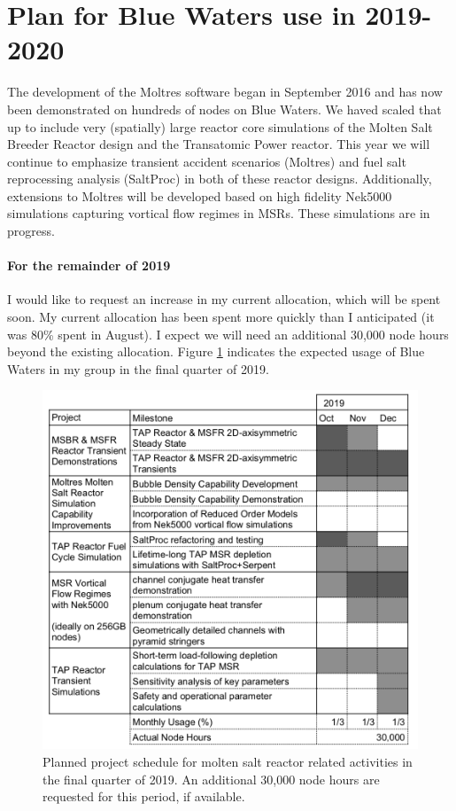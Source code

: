\documentclass[letterpaper]{article}
\begin{document}
\section{Plan for Blue Waters use in 2019-2020}

The development of the Moltres software  began in September 2016 and has now been
demonstrated on hundreds of nodes on Blue Waters. We haved scaled that up to
include very (spatially) large reactor core simulations of the Molten Salt 
Breeder Reactor design and the Transatomic Power reactor. This year we will 
continue to emphasize transient accident scenarios (Moltres) and fuel salt 
reprocessing analysis (SaltProc) in both of these reactor designs. 
Additionally, extensions to Moltres will be developed based on high fidelity 
Nek5000 simulations capturing vortical flow regimes in MSRs.  These 
simulations are in  progress.

\paragraph{For the remainder of 2019} I would like to request an increase in my 
current allocation, which will be spent soon. My current allocation has been 
spent more quickly than I anticipated (it was 80\% spent in August). I expect we will need an additional 
30,000 node hours beyond the existing allocation. Figure 
\ref{fig:2019-additional} indicates the expected usage of Blue Waters in my 
group in the final quarter of 2019.


\begin{figure}[htbp!]
\begin{center}
        \includegraphics[width=\textwidth]{bw-usage-2019-additional.png}
\end{center}
\caption{Planned project schedule for molten salt reactor related activities in 
the final quarter of 2019. An additional 30,000 node hours are requested for 
        this period, if available.}
\label{fig:2019-additional}
\end{figure}
\end{document}
